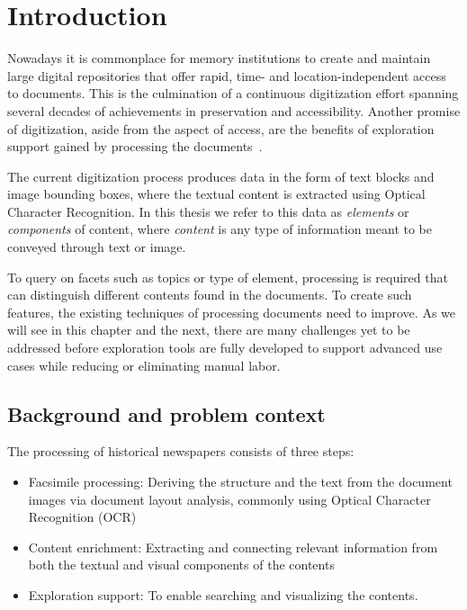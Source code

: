 \documentclass[oneside, english, bibtex]{kththesis}
\begin{document}
\chapter{Introduction}
\label{ch:introduction}

Nowadays it is commonplace for memory institutions to create and maintain large digital repositories that offer rapid, time- and location-independent access to documents.
This is the culmination of a continuous digitization effort spanning several decades of achievements in preservation and accessibility. Another promise of digitization, aside from the aspect of access, are the benefits of exploration support gained by processing the documents~\cite{jdmdh:7097}.

The current digitization process produces data in the form of text blocks and image bounding boxes, where the textual content is extracted using Optical Character Recognition. In this thesis we refer to this data as \textit{elements} or \textit{components} of content, where \textit{content} is any type of information meant to be conveyed through text or image.

To query on facets such as topics or type of element, processing is required that can distinguish different contents found in the documents.
To create such features, the existing techniques of processing documents need to improve.
As we will see in this chapter and the next, there are many challenges yet to be addressed before exploration tools are fully developed to support advanced use cases while reducing or eliminating manual labor.


\section{Background and problem context}
\label{sec:background}

The processing of historical newspapers consists of three steps:
\begin{itemize}
\item Facsimile processing: Deriving the structure and the text from the document images via document layout analysis, commonly using Optical Character Recognition (\gls{OCR})
\item Content enrichment: Extracting and connecting relevant information from both the textual and visual components of the contents
\item Exploration support: To enable searching and visualizing the contents.
\end{itemize}
\end{document}
